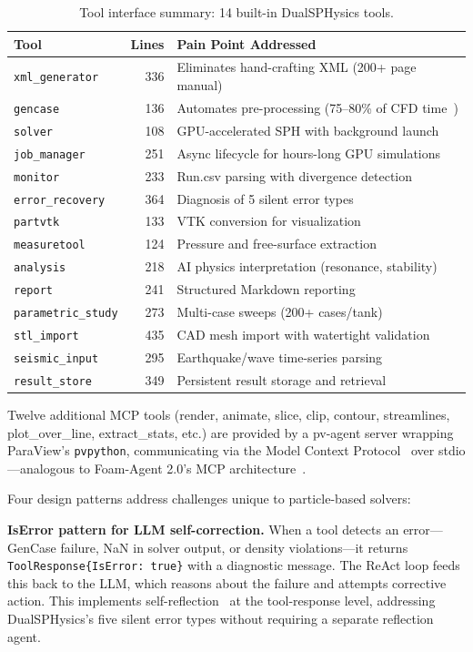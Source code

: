 \documentclass[11pt]{article}
\begin{document}
\begin{table}[htbp]
\centering
\caption{Tool interface summary: 14 built-in DualSPHysics tools.}
\label{tab:tools}
\small
\begin{tabular}{@{}lrl@{}}
\toprule
\textbf{Tool} & \textbf{Lines} & \textbf{Pain Point Addressed} \\
\midrule
\texttt{xml\_generator} & 336 & Eliminates hand-crafting XML (200+ page manual) \\
\texttt{gencase} & 136 & Automates pre-processing (75--80\% of CFD time~\citep{cadence2024}) \\
\texttt{solver} & 108 & GPU-accelerated SPH with background launch \\
\texttt{job\_manager} & 251 & Async lifecycle for hours-long GPU simulations \\
\texttt{monitor} & 233 & Run.csv parsing with divergence detection \\
\texttt{error\_recovery} & 364 & Diagnosis of 5 silent error types \\
\texttt{partvtk} & 133 & VTK conversion for visualization \\
\texttt{measuretool} & 124 & Pressure and free-surface extraction \\
\texttt{analysis} & 218 & AI physics interpretation (resonance, stability) \\
\texttt{report} & 241 & Structured Markdown reporting \\
\texttt{parametric\_study} & 273 & Multi-case sweeps (200+ cases/tank) \\
\texttt{stl\_import} & 435 & CAD mesh import with watertight validation \\
\texttt{seismic\_input} & 295 & Earthquake/wave time-series parsing \\
\texttt{result\_store} & 349 & Persistent result storage and retrieval \\
\bottomrule
\end{tabular}
\end{table}

Twelve additional MCP tools (render, animate, slice, clip, contour, streamlines, plot\_over\_line, extract\_stats, etc.) are provided by a pv-agent server wrapping ParaView's \texttt{pvpython}, communicating via the Model Context Protocol~\citep{mcp2024} over stdio---analogous to Foam-Agent 2.0's MCP architecture~\citep{foamagent2025}.

Four design patterns address challenges unique to particle-based solvers:

\textbf{IsError pattern for LLM self-correction.} When a tool detects an error---GenCase failure, NaN in solver output, or density violations---it returns \texttt{ToolResponse\{IsError: true\}} with a diagnostic message. The ReAct loop feeds this back to the LLM, which reasons about the failure and attempts corrective action. This implements self-reflection~\citep{shinn2023reflexion} at the tool-response level, addressing DualSPHysics's five silent error types without requiring a separate reflection agent.
\end{document}
